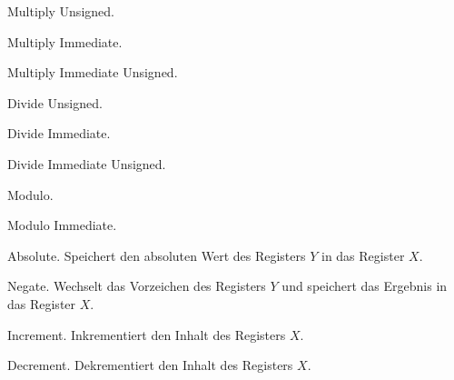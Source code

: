 \glqq Multiply Unsigned\grqq.



\glqq Multiply Immediate\grqq.



\glqq Multiply Immediate Unsigned\grqq.







\glqq Divide Unsigned\grqq.



\glqq Divide Immediate\grqq.



\glqq Divide Immediate Unsigned\grqq.



Modulo.


Modulo Immediate.



\glqq Absolute\grqq.
Speichert den absoluten Wert des Registers $Y$ in das Register $X$.



\glqq Negate\grqq.
Wechselt das Vorzeichen des Registers $Y$ und speichert das Ergebnis in das 
Register $X$.



\glqq Increment\grqq.
Inkrementiert den Inhalt des Registers $X$.



\glqq Decrement\grqq.
Dekrementiert den Inhalt des Registers $X$.





